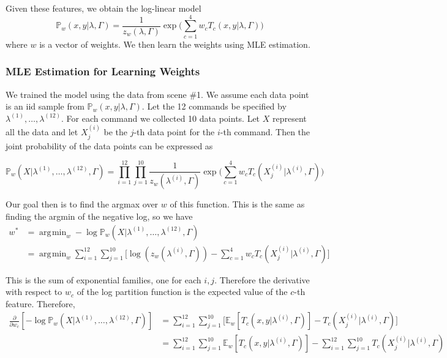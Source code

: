 \documentclass[12pt,letterpaper]{article}
\newcommand\prob{\mathbb{P}}
\newcommand\E{\mathbb{E}}
\DeclareMathOperator*{\argmin}{\arg\!\min}
\begin{document}
Given these features, we obtain the log-linear model
\[
\mathbb{P}_w(x, y|\lambda, \Gamma) = \frac{1}{z_w(\lambda, \Gamma)}\exp\bigg(\sum_{c = 1}^4w_cT_c(x, y|\lambda, \Gamma)\bigg)
\]
where $w$ is a vector of weights. We then learn the weights using MLE estimation.

\subsubsection{MLE Estimation for Learning Weights}
We trained the model using the data from scene \#1. We assume each data point is an iid sample from $\prob_w(x, y|\lambda, \Gamma)$. Let the 12 commands be specified by $\lambda^{(1)}, \ldots, \lambda^{(12)}$. For each command we collected 10 data points. Let $X$ represent all the data and let $X^{(i)}_j$ be the $j$-th data point for the $i$-th command. Then the joint probability of the data points can be expressed as

\[
\prob_w(X|\lambda^{(1)}, \ldots, \lambda^{(12)}, \Gamma) = \prod_{i = 1}^{12}\prod_{j = 1}^{10} \frac{1}{z_w(\lambda^{(i)}, \Gamma)}\exp\bigg(\sum_{c = 1}^4w_cT_c(X^{(i)}_j|\lambda^{(i)}, \Gamma)\bigg) 
\]

Our goal then is to find the argmax over $w$ of this function. This is the same as finding the argmin of the negative log, so we have
\begin{equation*}
\begin{split}
w^* &= \argmin_w -\log\prob_w(X|\lambda^{(1)}, \ldots, \lambda^{(12)}, \Gamma) \\
&= \argmin_w \sum_{i = 1}^{12}\sum_{j = 1}^{10}\bigg[\log(z_w(\lambda^{(i)}, \Gamma)) - \sum_{c = 1}^4w_cT_c(X^{(i)}_j|\lambda^{(i)}, \Gamma)\bigg]
\end{split}
\end{equation*}

This is the sum of exponential families, one for each $i, j$. Therefore the derivative with respect to $w_c$ of the log partition function is the expected value of the $c$-th feature. Therefore, 
\begin{equation*}
\begin{split}
\frac{\partial}{\partial w_c} [-\log\prob_w(X|\lambda^{(1)}, \ldots, \lambda^{(12)}, \Gamma)] &= \sum_{i = 1}^{12}\sum_{j = 1}^{10} \bigg[\E_w[T_c(x, y|\lambda^{(i)}, \Gamma)] - T_c(X^{(i)}_j|\lambda^{(i)}, \Gamma)\bigg] \\
&= \sum_{i = 1}^{12}\sum_{j = 1}^{10} \E_w[T_c(x, y|\lambda^{(i)}, \Gamma)] - \sum_{i = 1}^{12}\sum_{j = 1}^{10}T_c(X^{(i)}_j|\lambda^{(i)}, \Gamma)
\end{split}
\end{equation*}
\end{document}
